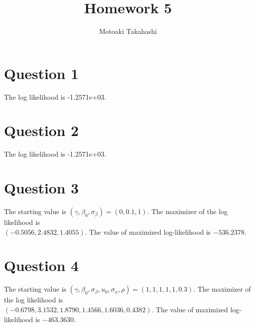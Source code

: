 \documentclass[12pt]{article}
\title{Homework 5}
\author{Motoaki Takahashi}
\date{}
\begin{document}
\maketitle
\section*{Question 1}
The log likelihood is -1.2571e+03.
\section*{Question 2}
The log likelihood is -1.2571e+03.
\section*{Question 3}
The starting value is $(\gamma, \beta_{0}, \sigma_{\beta})=(0, 0.1, 1)$. The maximizer of the log likelihood is\\ $(-0.5056,    2.4832,    1.4055)$. The value of maximized log-likelihood is $-536.2378$.
\section*{Question 4}
The starting value is $(\gamma, \beta_{0}, \sigma_{\beta}, u_{0}, \sigma_{u}, \rho)=(1, 1, 1, 1, 1, 0.3)$. The maximizer of the log likelihood is\\ $(-0.6798,    3.1532,    1.8790,    1.4566,    1.6036,    0.4382)$. The value of maximized log-likelihood is $-463.3630$.
\end{document}
